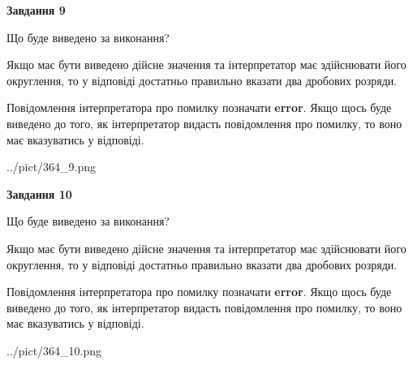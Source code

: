 \documentclass[12pt, ukrainian]{article}
\begin{document}
{\begin {Large}
{\begin {center}\textbf{Завдання 9}\end {center}}\par
Що буде виведено за виконання? \par

Якщо має бути виведено дійсне значення та інтерпретатор має здійснювати його округлення, 
то у відповіді достатньо правильно вказати два дробових розряди.

Повідомлення інтерпретатора про помилку позначати \textbf{error}.
Якщо щось буде виведено до того, як інтерпретатор видасть повідомлення про помилку, 
то воно має вказуватись у відповіді. \par

\begin{center}
	{../pict/364_9.png}
\end{center}
\newpage

{\begin {center}\textbf{Завдання 10}\end {center}}\par
Що буде виведено за виконання? \par

Якщо має бути виведено дійсне значення та інтерпретатор має здійснювати його округлення, 
то у відповіді достатньо правильно вказати два дробових розряди.

Повідомлення інтерпретатора про помилку позначати \textbf{error}.
Якщо щось буде виведено до того, як інтерпретатор видасть повідомлення про помилку, 
то воно має вказуватись у відповіді. \par

\begin{center}
	{../pict/364_10.png}
\end{center}
\newpage

\end {Large}}
\end{document}
